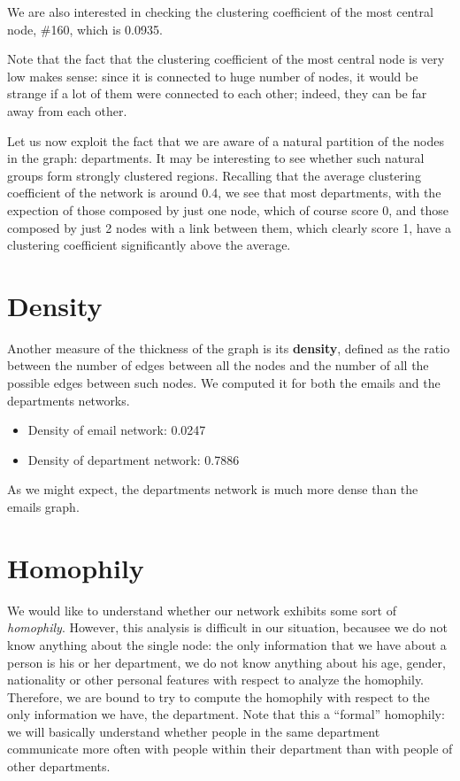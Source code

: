 \documentclass{report}
\theoremstyle{definition}
\theoremstyle{remark}
\begin{document}
We are also interested in checking the clustering coefficient of the most central node, \#160, which is 0.0935.  


Note that the fact that the clustering coefficient of the most central node is very low makes sense: since it is connected to huge number of nodes, it would be strange if a lot of them were connected to each other; indeed, they can be far away from each other.

Let us now exploit the fact that we are aware of a natural partition of the nodes in the graph: departments. It may be interesting to see whether such natural groups form strongly clustered regions. Recalling that the average clustering coefficient of the network is around 0.4, we see that most departments, with the expection of those composed by just one node, which of course score 0, and those composed by just 2 nodes with a link between them, which clearly score 1, have a clustering coefficient significantly above the average.\\
\section*{Density}
Another measure of the thickness of the graph is its \textbf{density}, defined as the ratio between the number of edges between all the nodes and the number of all the possible edges between such nodes. We computed it for both the emails and the departments networks.
\begin{itemize}
	\item Density of email network: 0.0247
	\item Density of department network: 0.7886
\end{itemize}
As we might expect, the departments network is much more dense than the emails graph.
\section*{Homophily}
We would like to understand whether our network exhibits some sort of \textit{homophily}. However, this analysis is difficult in our situation, becausee we do not know anything about the single node: the only information that we have about a person is his or her department, we do not know anything about his age, gender, nationality or other personal features with respect to analyze the homophily. Therefore, we are bound to try to compute the homophily with respect to the only information we have, the department. Note that this a ``formal'' homophily: we will basically understand whether people in the same department communicate more often with people within their department than with people of other departments.
\end{document}

